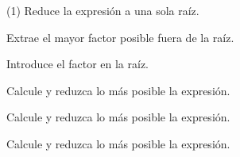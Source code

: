 \documentclass[]{srs}
\begin{document}
\begin{preguntas}(1)
  \pregunta Reduce la expresión a una sola raíz.
  \begin{mcaja}
  \end{mcaja}
  \begin{malla}[height=9cm]
  \end{malla}

  \pregunta Extrae el mayor factor posible fuera de la raíz.
  \begin{mcaja}
  \end{mcaja}
  \begin{malla}[height=10cm]
  \end{malla}
  \pregunta Introduce el factor en la raíz.
  \begin{mcaja}
  \end{mcaja}
  \begin{malla}[height=10cm]
  \end{malla}
  \pregunta Calcule y reduzca lo más posible la expresión.
  \begin{mcaja}
  \end{mcaja}
  \begin{malla}[height=10cm]
  \end{malla}
  \pregunta Calcule y reduzca lo más posible la expresión.
  \begin{mcaja}
  \end{mcaja}
  \begin{malla}[height=10cm]
  \end{malla}
  \pregunta Calcule y reduzca lo más posible la expresión.
  \begin{mcaja}
  \end{mcaja}
  \begin{malla}[height=10cm]
  \end{malla}
\end{preguntas}
\end{document}
